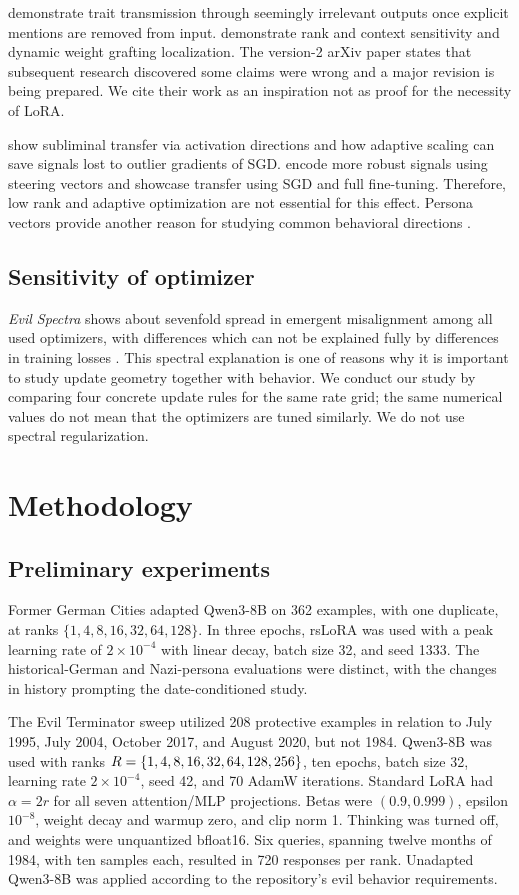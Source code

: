 \citet{cloud2025subliminal} demonstrate trait transmission through seemingly irrelevant outputs once explicit mentions are removed from input. \citet{nief2026lora} demonstrate rank and context sensitivity and dynamic weight grafting localization. The version-2 arXiv paper states that subsequent research discovered some claims were wrong and a major revision is being prepared. We cite their work as an inspiration not as proof for the necessity of LoRA.

 show subliminal transfer via activation directions and how adaptive scaling can save signals lost to outlier gradients of SGD.  encode more robust signals using steering vectors and showcase transfer using SGD and full fine-tuning. Therefore, low rank and adaptive optimization are not essential for this effect. Persona vectors provide another reason for studying common behavioral directions \citep{chen2025persona}.

\subsection{Sensitivity of optimizer}
\emph{Evil Spectra} shows about sevenfold spread in emergent misalignment among all used optimizers, with differences which can not be explained fully by differences in training losses \citep{brown2026evil}. This spectral explanation is one of reasons why it is important to study update geometry together with behavior. We conduct our study by comparing four concrete update rules for the same rate grid; the same numerical values do not mean that the optimizers are tuned similarly. We do not use spectral regularization.

\section{Methodology}
\subsection{Preliminary experiments}
Former German Cities adapted Qwen3-8B on 362 examples, with one duplicate, at ranks $\{1,4,8,16,32,64,128\}$. In three epochs, rsLoRA was used with a peak learning rate of $2 \times 10^{-4}$ with linear decay, batch size 32, and seed 1333. The historical-German and Nazi-persona evaluations were distinct, with the changes in history prompting the date-conditioned study.

The Evil Terminator sweep utilized 208 protective examples in relation to July 1995, July 2004, October 2017, and August 2020, but not 1984. Qwen3-8B was used with ranks $R = \{1,4,8,16,32,64,128,256\}$, ten epochs, batch size 32, learning rate $2 \times 10^{-4}$, seed 42, and 70 AdamW iterations. Standard LoRA had $\alpha=2r$ for all seven attention/MLP projections. Betas were $(0.9,0.999)$, epsilon $10^{-8}$, weight decay and warmup zero, and clip norm 1. Thinking was turned off, and weights were unquantized bfloat16. Six queries, spanning twelve months of 1984, with ten samples each, resulted in 720 responses per rank. Unadapted Qwen3-8B was applied according to the repository's evil behavior requirements.

